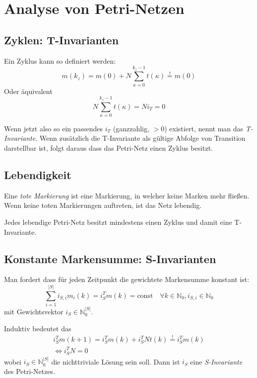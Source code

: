\section{Analyse von Petri-Netzen}
\subsection{Zyklen: T-Invarianten}
Ein Zyklus kann so definiert werden:
\begin{equation}
    m(k_z) = m(0) + N \sum_{\kappa=0}^{k_z-1} t(\kappa) \overset{!}{=} m(0)
\end{equation}
Oder äquivalent
\begin{equation}
    N \sum_{\kappa=0}^{k_z-1} t(\kappa) = N i_T = 0
\end{equation}

Wenn jetzt also so ein passendes $i_T$ (ganzzahlig, $>0$) existiert,
nennt man das \emph{T-Invariante}.
Wenn zusätzlich die T-Invariante als gültige Abfolge von Transition darstellbar ist,
folgt daraus dass das Petri-Netz einen Zyklus besitzt.

\subsection{Lebendigkeit}
Eine \emph{tote Markierung} ist eine Markierung, in welcher keine Marken mehr fließen.
Wenn keine toten Markierungen auftreten, ist das Netz lebendig.

Jedes lebendige Petri-Netz besitzt mindestens einen Zyklus und damit eine T-Invariante.

\subsection{Konstante Markensumme: S-Invarianten}
Man fordert dass für jeden Zeitpunkt die gewichtete Markensumme konstant ist:
\begin{equation}
    \sum_{i=1}^{|S|} i_{S,i} m_i(k) = i_S^T m(k) = \text{const} \quad
    \forall k\in \mathbb{N}_0, i_{S,i}\in \mathbb{N}_0
\end{equation}
mit Gewichtsvektor $i_S \in \mathbb{N}_0^{|S|}$.

Induktiv bedeutet das
\begin{equation}
\begin{gathered}
    i_S^Tm(k+1) = i_S^Tm(k) + i_S^TNt(k) \stackrel{!}{=} i_S^Tm(k) \\
    \iff i_S^TN = 0
\end{gathered}
\end{equation}
wobei $i_S \in \mathbb{N}_0^{|S|}$ die nichttriviale Lösung sein soll.
Dann ist $i_S$ eine \emph{S-Invariante} des Petri-Netzes.

